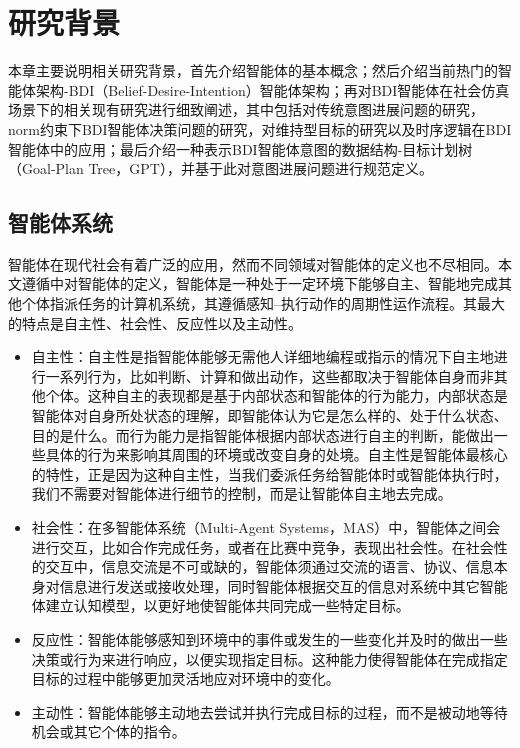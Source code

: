 \chapter{研究背景}\label{background}
本章主要说明相关研究背景，首先介绍智能体的基本概念；然后介绍当前热门的智能体架构-BDI（Belief-Desire-Intention）智能体架构；再对BDI智能体在社会仿真场景下的相关现有研究进行细致阐述，其中包括对传统意图进展问题的研究，norm约束下BDI智能体决策问题的研究，对维持型目标的研究以及时序逻辑在BDI智能体中的应用；最后介绍一种表示BDI智能体意图的数据结构-目标计划树（Goal-Plan Tree，GPT），并基于此对意图进展问题进行规范定义。
\section{智能体系统}
智能体在现代社会有着广泛的应用，然而不同领域对智能体的定义也不尽相同。本文遵循\cite{DBLP:journals/ker/WooldridgeJ95}中对智能体的定义，智能体是一种处于一定环境下能够自主、智能地完成其他个体指派任务的计算机系统，其遵循感知--执行动作的周期性运作流程。其最大的特点是自主性、社会性、反应性以及主动性。
\begin{itemize}
  \item 自主性：自主性是指智能体能够无需他人详细地编程或指示的情况下自主地进行一系列行为，比如判断、计算和做出动作，这些都取决于智能体自身而非其他个体。这种自主的表现都是基于内部状态和智能体的行为能力，内部状态是智能体对自身所处状态的理解，即智能体认为它是怎么样的、处于什么状态、目的是什么。而行为能力是指智能体根据内部状态进行自主的判断，能做出一些具体的行为来影响其周围的环境或改变自身的处境。自主性是智能体最核心的特性，正是因为这种自主性，当我们委派任务给智能体时或智能体执行时，我们不需要对智能体进行细节的控制，而是让智能体自主地去完成。
  \item 社会性：在多智能体系统（Multi-Agent Systems，MAS）中，智能体之间会进行交互，比如合作完成任务，或者在比赛中竞争，表现出社会性。在社会性的交互中，信息交流是不可或缺的，智能体须通过交流的语言、协议、信息本身对信息进行发送或接收处理，同时智能体根据交互的信息对系统中其它智能体建立认知模型，以更好地使智能体共同完成一些特定目标。
   \item 反应性：智能体能够感知到环境中的事件或发生的一些变化并及时的做出一些决策或行为来进行响应，以便实现指定目标。这种能力使得智能体在完成指定目标的过程中能够更加灵活地应对环境中的变化。
   \item 主动性：智能体能够主动地去尝试并执行完成目标的过程，而不是被动地等待机会或其它个体的指令。
\end{itemize}
